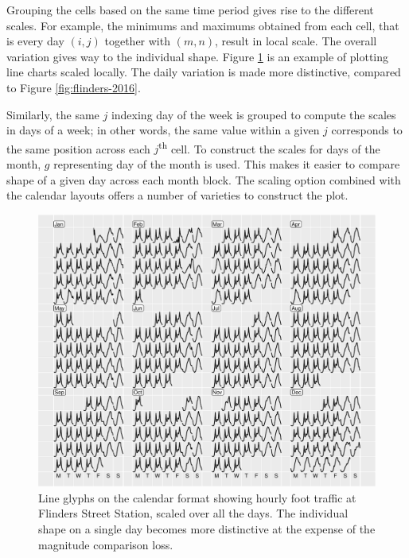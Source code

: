 \documentclass[article]{jss}
\begin{document}
Grouping the cells based on the same time period gives rise to the
different scales. For example, the minimums and maximums obtained from
each cell, that is every day \((i, j)\) together with \((m, n)\), result
in local scale. The overall variation gives way to the individual shape.
Figure \ref{fig:flinders-free} is an example of plotting line charts
scaled locally. The daily variation is made more distinctive, compared
to Figure \ref{fig:flinders-2016}.

Similarly, the same \(j\) indexing day of the week is grouped to compute
the scales in days of a week; in other words, the same value within a
given \(j\) corresponds to the same position across each
\(j\)\textsuperscript{th} cell. To construct the scales for days of the
month, \(g\) representing day of the month is used. This makes it easier
to compare shape of a given day across each month block. The scaling
option combined with the calendar layouts offers a number of varieties
to construct the plot.

\begin{CodeChunk}
\begin{figure}

{\centering \includegraphics[width=\textwidth]{figure/flinders-free-1} 

}

\caption[Line glyphs on the calendar format showing hourly foot traffic at Flinders Street Station, scaled over all the days]{Line glyphs on the calendar format showing hourly foot traffic at Flinders Street Station, scaled over all the days. The individual shape on a single day becomes more distinctive at the expense of the magnitude comparison loss.}\label{fig:flinders-free}
\end{figure}
\end{CodeChunk}
\end{document}
